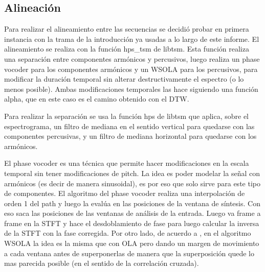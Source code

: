 \documentclass{article}
\begin{document}
\subsection{Alineación}


Para realizar el alineamiento entre las secuencias se decidió probar en primera instancia con la trama de la introducción ya usadas a lo largo de este informe. El alineamiento se realiza con la función hps\_tsm de libtsm. Esta función realiza una separación entre componentes armónicos y percusivos, luego realiza un phase vocoder para los componentes armónicos y un WSOLA para los percusivos, para modificar la duración temporal sin alterar destructivamente el espectro (o lo menos posible). Ambas modificaciones temporales las hace siguiendo una función alpha, que en este caso es el camino obtenido con el DTW. 

Para realizar la separación se usa la función hps de libtsm que aplica, sobre el espectrograma, un filtro de mediana en el sentido vertical para quedarse con las componentes percusivas, y un filtro de mediana horizontal para quedarse con los armónicos. 

El phase vocoder es una técnica que permite hacer modificaciones en la escala temporal sin tener modificaciones de pitch. La idea es poder modelar la señal con armónicos (es decir de manera sinusoidal), es por eso que solo sirve para este tipo de componentes. El algoritmo del phase vocoder realiza una interpolación de orden 1 del path y luego la evalúa en las posiciones de la ventana de síntesis. Con eso saca las posiciones de las ventanas de análisis de la entrada. Luego va frame a frame en la STFT y hace el desdoblamiento de fase para luego calcular la inversa de la STFT con la fase corregida. 
Por otro lado, de acuerdo a \cite{WSOLA}, en el algoritmo WSOLA la idea es la misma que con OLA pero dando un margen de movimiento a cada ventana antes de superponerlas de manera que la superposición quede lo mas parecida posible (en el sentido de la correlación cruzada). 
\end{document}
